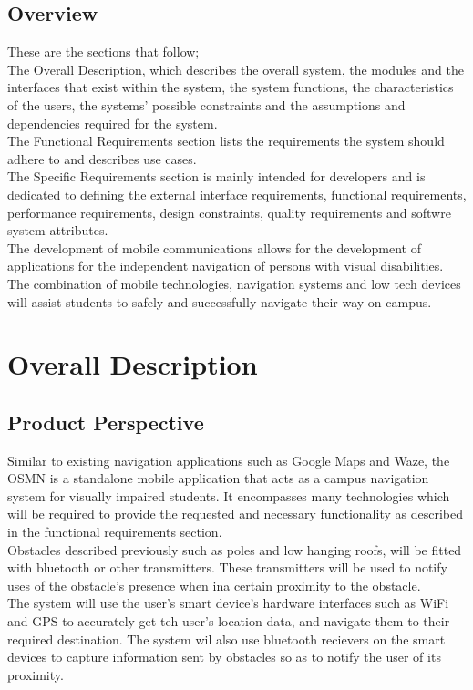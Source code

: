 \documentclass{article}
\begin{document}
	\subsection{Overview}
		These are the sections that follow; \\
		The Overall Description, which describes the overall system, the modules and the interfaces that exist within the system, the system functions, the characteristics of the users, the systems' possible constraints and the assumptions and dependencies required for the system.\\
		The Functional Requirements section lists the requirements the system should adhere to and describes use cases.\\
		The Specific Requirements section is mainly intended for developers and is dedicated to defining the external interface requirements, functional requirements, performance requirements, design constraints, quality requirements and softwre system attributes.\\
		The development of mobile communications allows for the development of applications for the independent navigation of persons with visual disabilities. The combination of mobile technologies, navigation systems and low tech devices will assist students to safely and successfully navigate their way on campus.	
		 

\newpage
\section{Overall Description}

	\subsection{Product Perspective}
		Similar to existing navigation applications such as Google Maps and Waze, the OSMN is a standalone mobile application that acts as a campus navigation system for visually impaired students. It encompasses many technologies which will be required to provide the requested and necessary functionality as described in the functional requirements section.\\
		Obstacles described previously such as poles and low hanging roofs, will be fitted with bluetooth or other transmitters. These transmitters will be used to notify uses of the obstacle's presence when ina certain proximity to the obstacle.\\
		The system will use the user's smart device's hardware interfaces such as WiFi and GPS to accurately get teh user's location data, and navigate them to their required destination. The system wil also use bluetooth recievers on the smart devices to capture information sent by obstacles so as to notify the user of its proximity.\\
		
\end{document}
